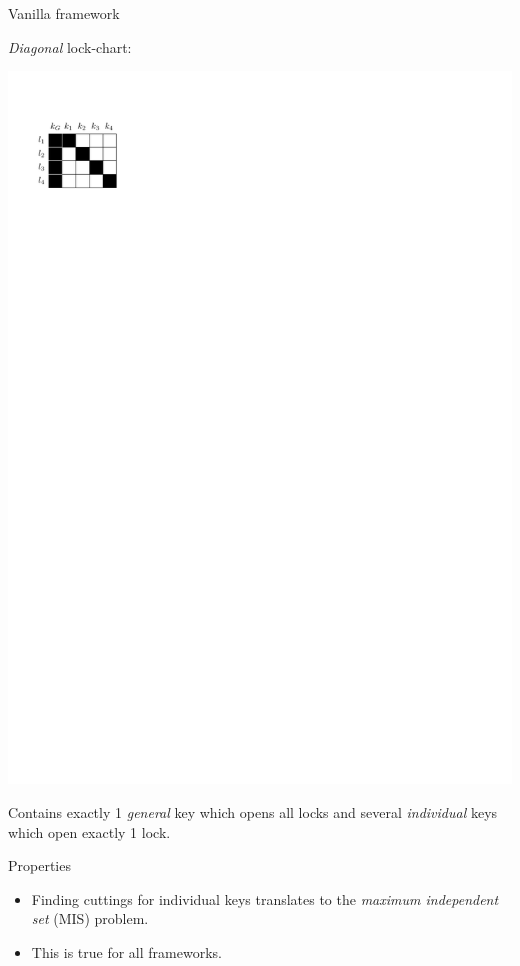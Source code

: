 \begin{frame}{Vanilla framework}
  \begin{minipage}[t][180pt][t]{.45\textwidth}
    \emph{Diagonal} lock-chart:

    \bigskip

    \includegraphics{DiagonalLockChart.pdf}

    Contains exactly 1 \emph{general} key which opens all locks
    and several \emph{individual} keys which open exactly 1 lock.
  \end{minipage}
  \pause
  \hfill
  \begin{minipage}[t][180pt][t]{.45\textwidth}
    \begin{block}{Properties}
      \begin{itemize}
        \item Finding cuttings for individual keys translates to the
        \textit{maximum independent set} (MIS) problem.
        \item This is true for all frameworks.
      \end{itemize}
    \end{block}
  \end{minipage}
\end{frame}

